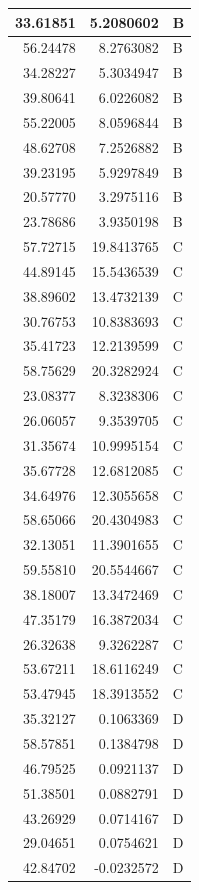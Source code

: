 \documentclass[
  letterpaper,
  DIV=11,
  numbers=noendperiod]{scrartcl}
\begin{document}
\begin{table}
\begin{tabular}[t]{r|r|l}
\hline
33.61851 & 5.2080602 & B\\
\hline
56.24478 & 8.2763082 & B\\
\hline
34.28227 & 5.3034947 & B\\
\hline
39.80641 & 6.0226082 & B\\
\hline
55.22005 & 8.0596844 & B\\
\hline
48.62708 & 7.2526882 & B\\
\hline
39.23195 & 5.9297849 & B\\
\hline
20.57770 & 3.2975116 & B\\
\hline
23.78686 & 3.9350198 & B\\
\hline
57.72715 & 19.8413765 & C\\
\hline
44.89145 & 15.5436539 & C\\
\hline
38.89602 & 13.4732139 & C\\
\hline
30.76753 & 10.8383693 & C\\
\hline
35.41723 & 12.2139599 & C\\
\hline
58.75629 & 20.3282924 & C\\
\hline
23.08377 & 8.3238306 & C\\
\hline
26.06057 & 9.3539705 & C\\
\hline
31.35674 & 10.9995154 & C\\
\hline
35.67728 & 12.6812085 & C\\
\hline
34.64976 & 12.3055658 & C\\
\hline
58.65066 & 20.4304983 & C\\
\hline
32.13051 & 11.3901655 & C\\
\hline
59.55810 & 20.5544667 & C\\
\hline
38.18007 & 13.3472469 & C\\
\hline
47.35179 & 16.3872034 & C\\
\hline
26.32638 & 9.3262287 & C\\
\hline
53.67211 & 18.6116249 & C\\
\hline
53.47945 & 18.3913552 & C\\
\hline
35.32127 & 0.1063369 & D\\
\hline
58.57851 & 0.1384798 & D\\
\hline
46.79525 & 0.0921137 & D\\
\hline
51.38501 & 0.0882791 & D\\
\hline
43.26929 & 0.0714167 & D\\
\hline
29.04651 & 0.0754621 & D\\
\hline
42.84702 & -0.0232572 & D\\

\end{tabular}
\end{table}
\end{document}
